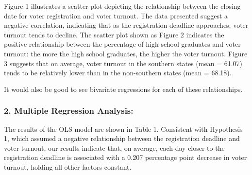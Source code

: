 \documentclass[
  letterpaper,
  DIV=11,
  numbers=noendperiod]{scrartcl}
\begin{document}
Figure 1 illustrates a scatter plot depicting the relationship between
the closing date for voter registration and voter turnout. The data
presented suggest a negative correlation, indicating that as the
registration deadline approaches, voter turnout tends to decline. The
scatter plot shown as Figure 2 indicates the positive relationship
between the percentage of high school graduates and voter turnout: the
more the high school graduates, the higher the voter turnout. Figure 3
suggests that on average, voter turnout in the southern states (mean =
61.07) tends to be relatively lower than in the non-southern states
(mean = 68.18).

\begin{tcolorbox}[enhanced jigsaw, titlerule=0mm, colframe=quarto-callout-note-color-frame, rightrule=.15mm, coltitle=black, leftrule=.75mm, breakable, colback=white, toprule=.15mm, left=2mm, bottomrule=.15mm, colbacktitle=quarto-callout-note-color!10!white, opacityback=0, arc=.35mm, bottomtitle=1mm, opacitybacktitle=0.6, title=\textcolor{quarto-callout-note-color}{\faInfo}\hspace{0.5em}{Note}, toptitle=1mm]

It would also be good to see bivariate regressions for each of these
relationships.

\end{tcolorbox}

\hypertarget{multiple-regression-analysis}{%
\subsubsection{\texorpdfstring{\textbf{2. Multiple Regression
Analysis:}}{2. Multiple Regression Analysis:}}\label{multiple-regression-analysis}}

The results of the OLS model are shown in Table 1. Consistent with
Hypothesis 1, which assumed a negative relationship between the
registration deadline and voter turnout, our results indicate that, on
average, each day closer to the registration deadline is associated with
a 0.207 percentage point decrease in voter turnout, holding all other
factors constant.
\end{document}
